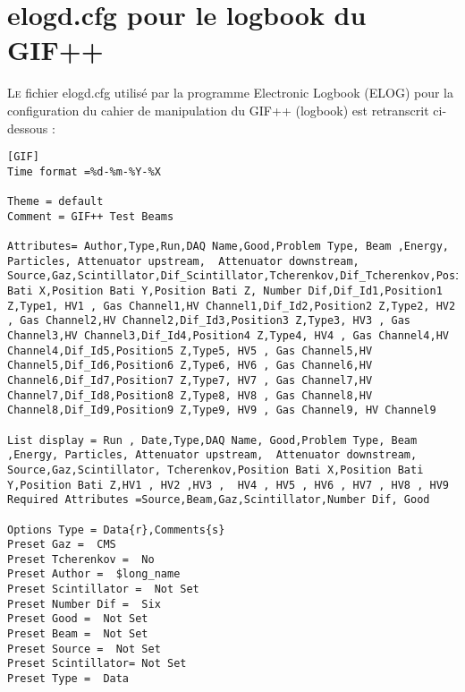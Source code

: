 \chapter{elogd.cfg pour le logbook du GIF++}
\label{elogd.cfg}
\renewcommand\chapterillustration{ELOG/ELOG}
\ThisULCornerWallPaper{1}{\chapterillustration}
\minitoc

\lettrine[lines=4, slope=-0.5em]{L}{e} fichier elogd.cfg utilisé par la programme Electronic Logbook (ELOG) pour la configuration du cahier de manipulation du GIF++ (logbook) est retranscrit ci-dessous :
\fontsize{10}{10} \selectfont
{
\begin{lstlisting}[breaklines=true,basicstyle=\tiny,postbreak=\mbox{\textcolor{red}{$\hookrightarrow$}\space},]
[GIF]
Time format =%d-%m-%Y-%X

Theme = default
Comment = GIF++ Test Beams

Attributes= Author,Type,Run,DAQ Name,Good,Problem Type, Beam ,Energy, Particles, Attenuator upstream,  Attenuator downstream, Source,Gaz,Scintillator,Dif_Scintillator,Tcherenkov,Dif_Tcherenkov,Position Bati X,Position Bati Y,Position Bati Z, Number Dif,Dif_Id1,Position1 Z,Type1, HV1 , Gas Channel1,HV Channel1,Dif_Id2,Position2 Z,Type2, HV2 , Gas Channel2,HV Channel2,Dif_Id3,Position3 Z,Type3, HV3 , Gas Channel3,HV Channel3,Dif_Id4,Position4 Z,Type4, HV4 , Gas Channel4,HV Channel4,Dif_Id5,Position5 Z,Type5, HV5 , Gas Channel5,HV Channel5,Dif_Id6,Position6 Z,Type6, HV6 , Gas Channel6,HV Channel6,Dif_Id7,Position7 Z,Type7, HV7 , Gas Channel7,HV Channel7,Dif_Id8,Position8 Z,Type8, HV8 , Gas Channel8,HV Channel8,Dif_Id9,Position9 Z,Type9, HV9 , Gas Channel9, HV Channel9

List display = Run , Date,Type,DAQ Name, Good,Problem Type, Beam ,Energy, Particles, Attenuator upstream,  Attenuator downstream, Source,Gaz,Scintillator, Tcherenkov,Position Bati X,Position Bati Y,Position Bati Z,HV1 , HV2 ,HV3 ,  HV4 , HV5 , HV6 , HV7 , HV8 , HV9
Required Attributes =Source,Beam,Gaz,Scintillator,Number Dif, Good

Options Type = Data{r},Comments{s}
Preset Gaz =  CMS
Preset Tcherenkov =  No
Preset Author =  $long_name
Preset Scintillator =  Not Set
Preset Number Dif =  Six
Preset Good =  Not Set
Preset Beam =  Not Set
Preset Source =  Not Set
Preset Scintillator= Not Set
Preset Type =  Data


\end{lstlisting}}
